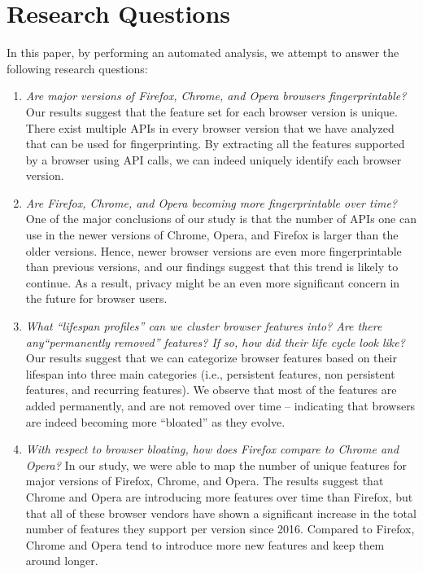 \section{Research Questions}
\label{sec:research}

In this paper, by performing an automated analysis, we attempt to
answer the following research questions:

\begin{enumerate}
  
\item {\em Are major versions of Firefox, Chrome, and Opera browsers
  fingerprintable?} Our results suggest that the feature set for each
  browser version is unique. There exist multiple
  APIs in every browser version that we have analyzed that can be used
  for fingerprinting. By extracting all the features supported by a
  browser using API calls, we can indeed uniquely identify each
  browser version.

\item {\em Are Firefox, Chrome, and Opera becoming more
  fingerprintable over time?} One of the major conclusions of our
  study is that the number of APIs one can use in the newer versions
  of Chrome, Opera, and Firefox is larger than the older versions. Hence, newer
  browser versions are even more fingerprintable than previous
  versions, and our findings suggest that this trend is likely to
  continue. As a result, privacy might be an even more significant
  concern in the future for browser users.
    
\item {\em What ``lifespan profiles'' can we cluster browser features
    into? Are there any``permanently removed'' features? If so, how
    did their life cycle look like?} Our results suggest that we can
  categorize browser features based on their lifespan into three main
  categories (i.e., persistent features, non persistent features, and
  recurring features). We observe that most of the features are added
  permanently, and are not removed over time -- indicating that
  browsers are indeed becoming more ``bloated'' as they evolve.

\item {\em With respect to browser bloating, how does Firefox compare
    to Chrome and Opera?} In our study, we were able to map the number of unique
  features for major versions of Firefox, Chrome, and Opera. The results
  suggest that Chrome and Opera are introducing more features over time than
  Firefox, but that all of these browser vendors have shown a significant
  increase in the total number of features they support per version
  since 2016. Compared to Firefox, Chrome and Opera tend to introduce more new
  features and keep them around longer.
 

\end{enumerate}
